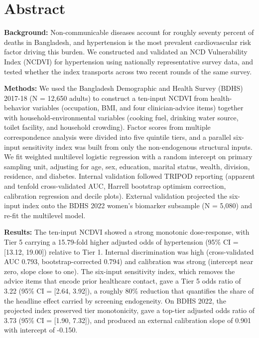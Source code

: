 \documentclass[
  12pt,
  a4paper]{article}
\author{}
\date{\vspace{-2.5em}}
\begin{document}


\newpage
{}

\section*{Abstract}\label{abstract}

\textbf{Background:} Non-communicable diseases account for roughly seventy percent of deaths in Bangladesh, and hypertension is the most prevalent cardiovascular risk factor driving this burden. We constructed and validated an NCD Vulnerability Index (NCDVI) for hypertension using nationally representative survey data, and tested whether the index transports across two recent rounds of the same survey.

\textbf{Methods:} We used the Bangladesh Demographic and Health Survey (BDHS) 2017-18 (N = 12,650 adults) to construct a ten-input NCDVI from health-behavior variables (occupation, BMI, and four clinician-advice items) together with household-environmental variables (cooking fuel, drinking water source, toilet facility, and household crowding). Factor scores from multiple correspondence analysis were divided into five quintile tiers, and a parallel six-input sensitivity index was built from only the non-endogenous structural inputs. We fit weighted multilevel logistic regression with a random intercept on primary sampling unit, adjusting for age, sex, education, marital status, wealth, division, residence, and diabetes. Internal validation followed TRIPOD reporting (apparent and tenfold cross-validated AUC, Harrell bootstrap optimism correction, calibration regression and decile plots). External validation projected the six-input index onto the BDHS 2022 women's biomarker subsample (N = 5,080) and re-fit the multilevel model.

\textbf{Results:} The ten-input NCDVI showed a strong monotonic dose-response, with Tier 5 carrying a 15.79-fold higher adjusted odds of hypertension (95\% CI = {[}13.12, 19.00{]}) relative to Tier 1. Internal discrimination was high (cross-validated AUC 0.793, bootstrap-corrected 0.794) and calibration was strong (intercept near zero, slope close to one). The six-input sensitivity index, which removes the advice items that encode prior healthcare contact, gave a Tier 5 odds ratio of 3.22 (95\% CI = {[}2.64, 3.92{]}), a roughly 80\% reduction that quantifies the share of the headline effect carried by screening endogeneity. On BDHS 2022, the projected index preserved tier monotonicity, gave a top-tier adjusted odds ratio of 3.73 (95\% CI = {[}1.90, 7.32{]}), and produced an external calibration slope of 0.901 with intercept of -0.150.
\end{document}
